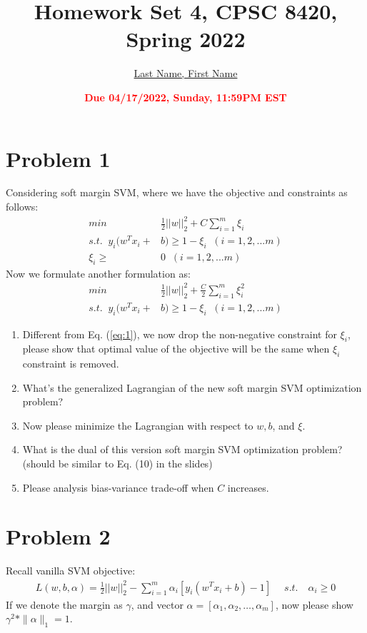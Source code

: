 \documentclass[11pt]{article}
\title{{\bf Homework Set 4, CPSC 8420, Spring 2022}} %
\author{\Large\underline{Last Name, First Name}}
\date{\textbf{\Large\textcolor{red}{Due 04/17/2022, Sunday, 11:59PM EST}}} %
\begin{document}
\maketitle

\section*{Problem 1}
Considering soft margin SVM, where we have the objective and constraints as follows:
\begin{equation}\label{eq:1}
	\begin{aligned}
		min\;\; &\frac{1}{2}||w||_2^2 +C\sum\limits_{i=1}^{m}\xi_i\\s.t.  \;\; y_i(w^Tx_i + &b)  \geq 1 - \xi_i \;\;(i =1,2,...m)\\\xi_i \geq &0 \;\;(i =1,2,...m)
	\end{aligned}
\end{equation}
Now we formulate another formulation as:
\begin{equation}
	\begin{aligned}
		min\;\; &\frac{1}{2}||w||_2^2 +\frac{C}{2}\sum\limits_{i=1}^{m}\xi_i^2\\s.t.  \;\; y_i(w^Tx_i + &b)  \geq 1 - \xi_i \;\;(i =1,2,...m)
	\end{aligned}
\end{equation}
\begin{enumerate}
	\item Different from Eq. (\ref{eq:1}), we now drop the non-negative constraint for $\xi_i$, please show that optimal value of the objective will be the same when $\xi_i$ constraint is removed.
	\item What's the generalized Lagrangian of the new soft margin SVM optimization problem?
	\item Now please minimize the Lagrangian with respect to $w, b$, and $\xi$.
	\item What is the dual of this version soft margin SVM optimization problem? (should be similar to Eq. (10) in the slides)
	\item Please analysis bias-variance trade-off when $C$ increases.
\end{enumerate}

\section*{Problem 2}
Recall vanilla SVM objective:
\begin{equation}
\begin{aligned}
L(w,b,\alpha) = \frac{1}{2}||w||_2^2 - \sum\limits_{i=1}^{m}\alpha_i[y_i(w^Tx_i + b) - 1] \; \quad s.t. \quad \alpha_i \geq 0
\end{aligned}
\end{equation}
If we denote the margin as $\gamma$, and vector $\alpha=[\alpha_1, \alpha_2, \dots, \alpha_m]$, now please show $\gamma^2*\|\alpha\|_1=1$.
\end{document}
